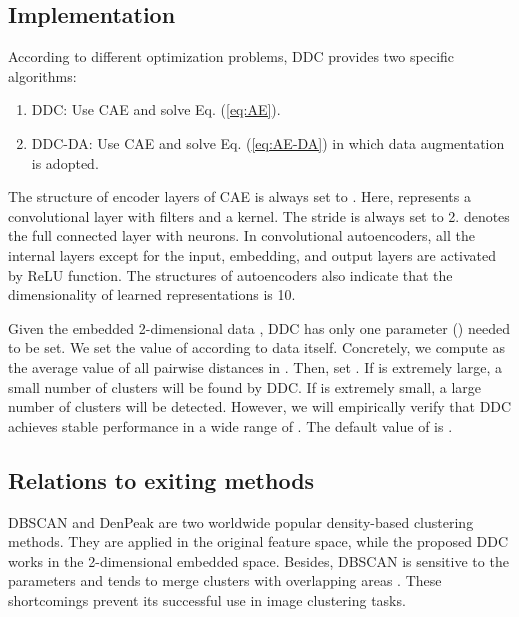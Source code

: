 \documentclass[10pt,twocolumn,letterpaper]{article}
\begin{document}
\subsection{Implementation}\label{sec:Implementation}
According to different optimization problems, DDC provides two specific algorithms:
\begin{enumerate}[(1)] \item DDC: Use CAE and solve Eq. (\ref{eq:AE}).
\item DDC-DA: Use CAE and solve Eq. (\ref{eq:AE-DA}) in which data augmentation is adopted.
\end{enumerate}

The structure of encoder layers of CAE is always set to .  Here,  represents a convolutional layer with  filters and a  kernel.  The stride is always set to 2.  denotes the full connected layer with  neurons.
In convolutional autoencoders, all the internal layers except for the input, embedding, and output layers are activated by ReLU function.
The structures of autoencoders also indicate that the dimensionality of learned representations  is 10.

Given the embedded 2-dimensional data , DDC has only one parameter () needed to be set. 
We set the value of  according to data  itself. Concretely, we compute  as the average value of all pairwise distances in . Then, set . 
If  is extremely large, a small number of clusters will be found by DDC. If  is extremely small, a large number of clusters will be detected. 
However, we will empirically verify that DDC achieves stable performance in a wide range of . The default value of  is .


\subsection{Relations to exiting methods}
DBSCAN \cite{ester1996density} and DenPeak \cite{rodriguez2014clustering} are two worldwide popular density-based clustering methods. They are applied in the original feature space, while the proposed DDC works in the 2-dimensional embedded space. Besides, DBSCAN is sensitive to the parameters and tends to merge clusters with overlapping areas \cite{ester1996density,Ren2014Boosted}. These shortcomings prevent its successful use in image clustering tasks.
\end{document}

